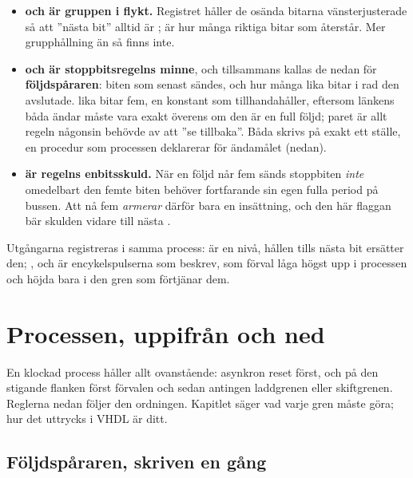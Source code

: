 \begin{itemize}
  \item \textbf{ och  är gruppen i flykt.} Registret håller de
    osända bitarna vänsterjusterade så att ”nästa bit” alltid är ;
     är hur många riktiga bitar som återstår. Mer grupphållning än så finns inte.
  \item \textbf{ och  är stoppbitsregelns minne}, och tillsammans
    kallas de nedan för \textbf{följdspåraren}: biten som senast sändes, och hur många lika bitar i
    rad den avslutade.  lika bitar \textemdash{} fem, en konstant som 
    tillhandahåller, eftersom länkens båda ändar måste vara exakt överens om den \textemdash{} är en
    full följd; paret är allt regeln någonsin behövde av att ”se tillbaka”. Båda skrivs på exakt ett
    ställe, en procedur som processen deklarerar för ändamålet (nedan).
  \item \textbf{ är regelns enbitsskuld.} När en följd når fem sänds stoppbiten
    \emph{inte} omedelbart \textemdash{} den femte biten behöver fortfarande sin egen fulla period på
    bussen. Att nå fem \emph{armerar} därför bara en insättning, och den här flaggan bär skulden
    vidare till nästa .
\end{itemize}

Utgångarna registreras i samma process:  är en nivå, hållen tills nästa bit ersätter
den; ,  och  är encykelspulserna som 
beskrev, som förval låga högst upp i processen och höjda bara i den gren som förtjänar dem.

\section{Processen, uppifrån och ned}
\label{c14:sec:process}

En klockad process håller allt ovanstående: asynkron reset först, och på den stigande flanken först
förvalen och sedan antingen laddgrenen eller skiftgrenen. Reglerna nedan följer den ordningen.
Kapitlet säger vad varje gren måste göra; hur det uttrycks i VHDL är ditt.

\subsection{Följdspåraren, skriven en gång}
\label{c14:sub:tracker}

